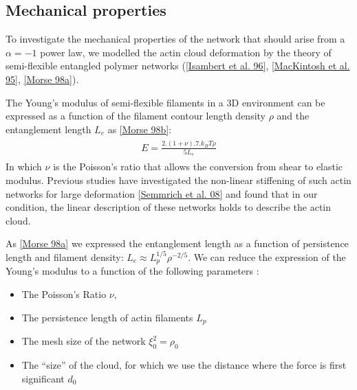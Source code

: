 \documentclass[A4paperpaper,11pt,english]{sphinxmanual}
\begin{document}
\subsection{Mechanical properties}
\label{index-latex:mechanical-properties}
To investigate the mechanical properties of the network that should arise from
a \(\alpha = -1\) power law, we modelled the actin cloud deformation by
the theory of semi-flexible entangled polymer networks ({\hyperref[index-latex:isambert1996]{{[}Isambert et al. 96{]}}},
{\hyperref[index-latex:mackintosh1995]{{[}MacKintosh et al. 95{]}}}, {\hyperref[index-latex:morse1998a]{{[}Morse 98a{]}}}).

The Young's modulus of semi-flexible filaments in a 3D environment can be
expressed as a function of the filament contour length density \(\rho\) and the
entanglement length \(L_e\) as {\hyperref[index-latex:morse1998b]{{[}Morse 98b{]}}}:
\label{index-latex:equation-eqa37}\begin{gather}
\begin{split}E= \frac{2.(1+\nu).7.k_BT \rho}{5L_e}\end{split}\label{index-latex-eqa37}
\end{gather}
In which \(\nu\) is the Poisson’s ratio that allows the conversion from shear to
elastic modulus. Previous studies have investigated the non-linear stiffening of
such actin networks for large deformation {\hyperref[index-latex:semmrich2008]{{[}Semmrich et al. 08{]}}} and found that in
our condition, the linear description of these networks holds to describe the
actin cloud.

As {\hyperref[index-latex:morse1998a]{{[}Morse 98a{]}}} we expressed the entanglement length as a
function of persistence length and filament density: \(L_e\approx L_p^{1/5} \rho^{-2/5}\). We can
reduce the expression of the Young's modulus to a function of the following
parameters :
\begin{itemize}
\item {} 
The Poisson’s Ratio \(\nu\),

\item {} 
The persistence length of actin filaments \(L_p\)

\item {} 
The mesh size of the network \(\xi_0^2 = \rho_0\)

\item {} 
The ``size'' of the cloud, for which we use the distance where the force
is first significant \(d_0\)

\end{itemize}
\end{document}
